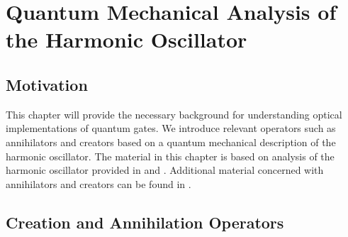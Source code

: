 \chapter{Quantum Mechanical Analysis of the Harmonic Oscillator\label{ch:qmech}}

\section{Motivation}
This chapter will provide the necessary background for understanding optical implementations of quantum gates. We introduce relevant operators such as annihilators and creators based on a quantum mechanical description of the harmonic oscillator. The material in this chapter is based on analysis of the harmonic oscillator provided in \cite{goldstein} and \cite{griffiths}. Additional material concerned with annihilators and creators can be found in \cite{klm}.

\section{Creation and Annihilation Operators\label{annihilators}}

